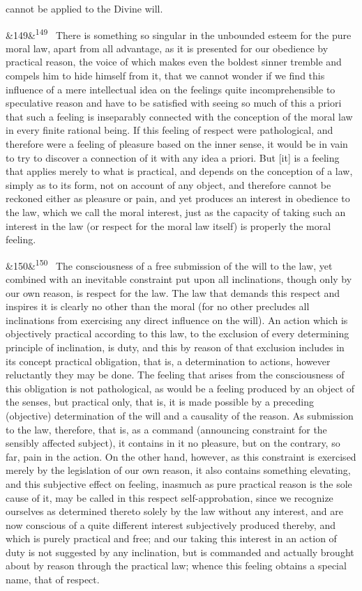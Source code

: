 \documentclass[12pt]{article}
\newcommand{\para}[1][]{\par\noindent\ifx&#1&\else\textsuperscript{\footnotesize #1}~\fi}
\begin{document}
cannot be applied to the Divine will.

\para[149] There is something so singular in the unbounded esteem for the pure moral law, apart from all advantage, as it is presented for our obedience by practical reason, the voice of which makes even the boldest sinner tremble and compels him to hide himself from it, that we cannot wonder if we find this influence of a mere intellectual idea on the feelings quite incomprehensible to speculative reason and have to be satisfied with seeing so much of this a priori that such a feeling is inseparably connected with the conception of the moral law in every finite rational being. If this feeling of respect were pathological, and therefore were a feeling of pleasure based on the inner sense, it would be in vain to try to discover a connection of it with any idea a priori. But [it] is a feeling that applies merely to what is practical, and depends on the conception of a law, simply as to its form, not on account of any object, and therefore cannot be reckoned either as pleasure or pain, and yet produces an interest in obedience to the law, which we call the moral interest, just as the capacity of taking such an interest in the law (or respect for the moral law itself) is properly the moral feeling.

\para[150] The consciousness of a free submission of the will to the law, yet combined with an inevitable constraint put upon all inclinations, though only by our own reason, is respect for the law. The law that demands this respect and inspires it is clearly no other than the moral (for no other precludes all inclinations from exercising any direct influence on the will). An action which is objectively practical according to this law, to the exclusion of every determining principle of inclination, is duty, and this by reason of that exclusion includes in its concept practical obligation, that is, a determination to actions, however reluctantly they may be done. The feeling that arises from the consciousness of this obligation is not pathological, as would be a feeling produced by an object of the senses, but practical only, that is, it is made possible by a preceding (objective) determination of the will and a causality of the reason. As submission to the law, therefore, that is, as a command (announcing constraint for the sensibly affected subject), it contains in it no pleasure, but on the contrary, so far, pain in the action. On the other hand, however, as this constraint is exercised merely by the legislation of our own reason, it also contains something elevating, and this subjective effect on feeling, inasmuch as pure practical reason is the sole cause of it, may be called in this respect self-approbation, since we recognize ourselves as determined thereto solely by the law without any interest, and are now conscious of a quite different interest subjectively produced thereby, and which is purely practical and free; and our taking this interest in an action of duty is not suggested by any inclination, but is commanded and actually brought about by reason through the practical law; whence this feeling obtains a special name, that of respect.
\end{document}
